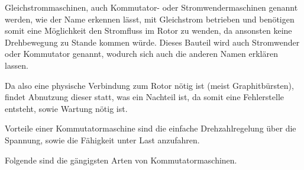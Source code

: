 Gleichstrommaschinen, auch Kommutator- oder Stromwendermaschinen genannt werden, wie der Name erkennen lässt, mit Gleichstrom betrieben und benötigen somit eine Möglichkeit den Stromfluss im Rotor zu wenden, da ansonsten keine Drehbewegung zu Stande kommen würde. 
Dieses Bauteil wird auch Stromwender oder Kommutator genannt, wodurch sich auch die anderen Namen erklären lassen.

Da also eine physische Verbindung zum Rotor nötig ist (meist Graphitbürsten), findet Abnutzung dieser statt, was ein Nachteil ist, da somit eine Fehlerstelle entsteht, sowie Wartung nötig ist.

Vorteile einer Kommutatormaschine sind die einfache Drehzahlregelung über die Spannung, sowie die Fähigkeit unter Last anzufahren.

Folgende sind die gängigsten Arten von Kommutatormaschinen.

\cite{dcdewiki:208635995}